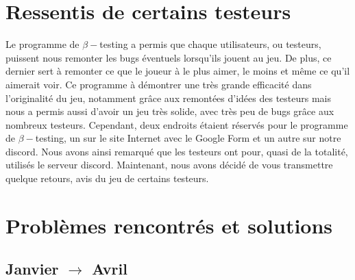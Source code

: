 \documentclass[a4paper,12pt]{article}
\begin{document}
        
        
    \section{Ressentis de certains testeurs}
        Le programme de \(\beta-\)testing a permis que chaque utilisateurs, ou testeurs, puissent nous remonter les bugs éventuels lorsqu'ils jouent au jeu. De plus, ce dernier sert à remonter ce que le joueur à le plus aimer, le moins et même ce qu'il aimerait voir. Ce programme à démontrer une très grande efficacité dans l'originalité du jeu, notamment grâce aux remontées d'idées des testeurs mais nous a permis aussi d'avoir un jeu très solide, avec très peu de bugs grâce aux nombreux testeurs. Cependant, deux endroits étaient réservés pour le programme de \(\beta-\)testing, un sur le site Internet avec le Google Form et un autre sur notre discord. Nous avons ainsi remarqué que les testeurs ont pour, quasi de la totalité, utilisés le serveur discord.
        Maintenant, nous avons décidé de vous transmettre quelque retours, avis du jeu de certains testeurs.
        
        
    
    
    
    \section{Problèmes rencontrés et solutions}
        \subsection{Janvier $\to$ Avril}
        
\end{document}
